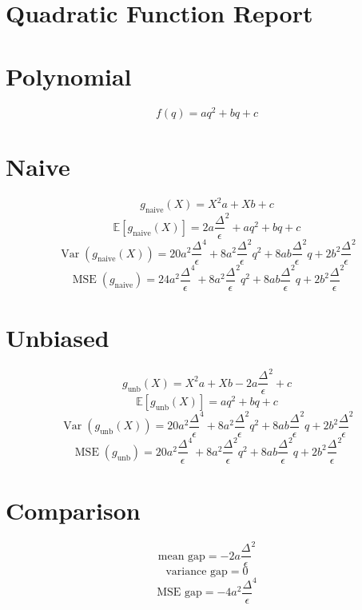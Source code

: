 \documentclass{article}
\begin{document}
\section*{Quadratic Function Report}
\section*{Polynomial}
\begin{dmath*}
f(q) = a q^{2} + b q + c
\end{dmath*}
\section*{Naive}
\begin{dmath*}
g_{\mathrm{naive}}(X) = X^{2} a + X b + c
\end{dmath*}
\begin{dmath*}
\mathbb{E}[g_{\mathrm{naive}}(X)] = 2 a {\frac{\Delta}{\epsilon}}^{2} + a q^{2} + b q + c
\end{dmath*}
\begin{dmath*}
\operatorname{Var}(g_{\mathrm{naive}}(X)) = 20 a^{2} {\frac{\Delta}{\epsilon}}^{4} + 8 a^{2} {\frac{\Delta}{\epsilon}}^{2} q^{2} + 8 a b {\frac{\Delta}{\epsilon}}^{2} q + 2 b^{2} {\frac{\Delta}{\epsilon}}^{2}
\end{dmath*}
\begin{dmath*}
\operatorname{MSE}(g_{\mathrm{naive}}) = 24 a^{2} {\frac{\Delta}{\epsilon}}^{4} + 8 a^{2} {\frac{\Delta}{\epsilon}}^{2} q^{2} + 8 a b {\frac{\Delta}{\epsilon}}^{2} q + 2 b^{2} {\frac{\Delta}{\epsilon}}^{2}
\end{dmath*}
\section*{Unbiased}
\begin{dmath*}
g_{\mathrm{unb}}(X) = X^{2} a + X b - 2 a {\frac{\Delta}{\epsilon}}^{2} + c
\end{dmath*}
\begin{dmath*}
\mathbb{E}[g_{\mathrm{unb}}(X)] = a q^{2} + b q + c
\end{dmath*}
\begin{dmath*}
\operatorname{Var}(g_{\mathrm{unb}}(X)) = 20 a^{2} {\frac{\Delta}{\epsilon}}^{4} + 8 a^{2} {\frac{\Delta}{\epsilon}}^{2} q^{2} + 8 a b {\frac{\Delta}{\epsilon}}^{2} q + 2 b^{2} {\frac{\Delta}{\epsilon}}^{2}
\end{dmath*}
\begin{dmath*}
\operatorname{MSE}(g_{\mathrm{unb}}) = 20 a^{2} {\frac{\Delta}{\epsilon}}^{4} + 8 a^{2} {\frac{\Delta}{\epsilon}}^{2} q^{2} + 8 a b {\frac{\Delta}{\epsilon}}^{2} q + 2 b^{2} {\frac{\Delta}{\epsilon}}^{2}
\end{dmath*}
\section*{Comparison}
\begin{dmath*}
\text{mean gap} = - 2 a {\frac{\Delta}{\epsilon}}^{2}
\end{dmath*}
\begin{dmath*}
\text{variance gap} = 0
\end{dmath*}
\begin{dmath*}
\text{MSE gap} = - 4 a^{2} {\frac{\Delta}{\epsilon}}^{4}
\end{dmath*}
\end{document}
